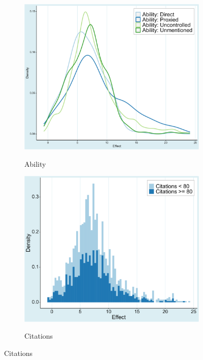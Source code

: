 \begin{figure}[!htbp]
\begin{center}
      \begin{subfigure}[!htbp]{0.38\textwidth}
         \vspace{0.2cm}
         \caption{Ability}
         \vspace{-0.1cm}
         \includegraphics[width=0.95\linewidth]{Figures/Prima Facie/prima_facie_ability.png}
         \label{fig:prima_facie_ability}
      \end{subfigure}
      \begin{subfigure}[!htbp]{0.38\textwidth}
         \vspace{0.2cm}
         \caption{Citations}
         \vspace{-0.1cm}
         \includegraphics[width=0.95\linewidth]{Figures/Prima Facie/prima_facie_citations.png}
         \label{fig:prima_facie_citations}
      \end{subfigure}


\end{center}
\end{figure}

